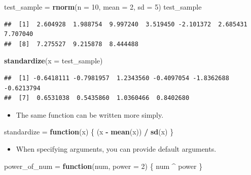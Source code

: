 \documentclass[]{book}
\newenvironment{Shaded}{\begin{snugshade}}{\end{snugshade}}
\newcommand{\KeywordTok}[1]{\textcolor[rgb]{0.13,0.29,0.53}{\textbf{#1}}}
\newcommand{\DataTypeTok}[1]{\textcolor[rgb]{0.13,0.29,0.53}{#1}}
\newcommand{\DecValTok}[1]{\textcolor[rgb]{0.00,0.00,0.81}{#1}}
\newcommand{\StringTok}[1]{\textcolor[rgb]{0.31,0.60,0.02}{#1}}
\newcommand{\ControlFlowTok}[1]{\textcolor[rgb]{0.13,0.29,0.53}{\textbf{#1}}}
\newcommand{\OperatorTok}[1]{\textcolor[rgb]{0.81,0.36,0.00}{\textbf{#1}}}
\newcommand{\NormalTok}[1]{#1}
\providecommand{\tightlist}{%
  \setlength{\itemsep}{0pt}\setlength{\parskip}{0pt}}
\begin{document}
\begin{Shaded}
\begin{Highlighting}[]
\NormalTok{test_sample =}\StringTok{ }\KeywordTok{rnorm}\NormalTok{(}\DataTypeTok{n =} \DecValTok{10}\NormalTok{, }\DataTypeTok{mean =} \DecValTok{2}\NormalTok{, }\DataTypeTok{sd =} \DecValTok{5}\NormalTok{)}
\NormalTok{test_sample}
\end{Highlighting}
\end{Shaded}

\begin{verbatim}
##  [1]  2.604928  1.988754  9.997240  3.519450 -2.101372  2.685431  7.707040
##  [8]  7.275527  9.215878  8.444488
\end{verbatim}

\begin{Shaded}
\begin{Highlighting}[]
\KeywordTok{standardize}\NormalTok{(}\DataTypeTok{x =}\NormalTok{ test_sample)}
\end{Highlighting}
\end{Shaded}

\begin{verbatim}
##  [1] -0.6418111 -0.7981957  1.2343560 -0.4097054 -1.8362688 -0.6213794
##  [7]  0.6531038  0.5435860  1.0360466  0.8402680
\end{verbatim}

\begin{itemize}
\tightlist
\item
  The same function can be written more simply.
\end{itemize}

\begin{Shaded}
\begin{Highlighting}[]
\NormalTok{standardize =}\StringTok{ }\ControlFlowTok{function}\NormalTok{(x) \{}
\NormalTok{  (x }\OperatorTok{-}\StringTok{ }\KeywordTok{mean}\NormalTok{(x)) }\OperatorTok{/}\StringTok{ }\KeywordTok{sd}\NormalTok{(x)}
\NormalTok{\}}
\end{Highlighting}
\end{Shaded}

\begin{itemize}
\tightlist
\item
  When specifying arguments, you can provide default arguments.
\end{itemize}

\begin{Shaded}
\begin{Highlighting}[]
\NormalTok{power_of_num =}\StringTok{ }\ControlFlowTok{function}\NormalTok{(num, }\DataTypeTok{power =} \DecValTok{2}\NormalTok{) \{}
\NormalTok{  num }\OperatorTok{^}\StringTok{ }\NormalTok{power}
\NormalTok{\}}
\end{Highlighting}
\end{Shaded}
\end{document}
